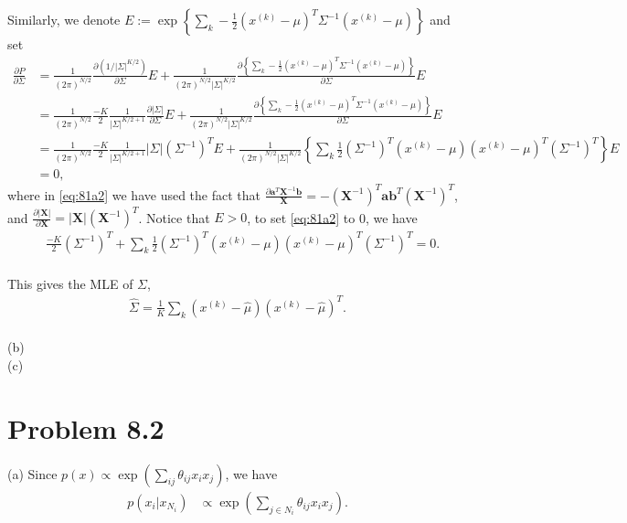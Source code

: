 \documentclass{article}
\newcommand{\bm}{\mathbf}
\begin{document}
Similarly, we denote $E := \exp\left\{\sum_k -\frac{1}{2}(x^{(k)}-\mu)^T\Sigma^{-1}(x^{(k)}-\mu)\right\}$ and set
\begin{align}
	\frac{\partial P}{\partial \Sigma} &= 
	\frac{1}{(2\pi)^{N/2}}\frac{\partial
	\left(1/|\Sigma|^{K/2}\right)}{\partial \Sigma}E +
	\frac{1}{(2\pi)^{N/2}|\Sigma|^{K/2}}
	\frac{\partial\left\{\sum_k -\frac{1}{2}(x^{(k)}-\mu)^T
	\Sigma^{-1}(x^{(k)}-\mu)\right\}}{\partial \Sigma}E\\
	&= \frac{1}{(2\pi)^{N/2}} \frac{-K}{2}\frac{1}
	{|\Sigma|^{K/2 + 1}}\frac{\partial |\Sigma|}{\partial \Sigma}E + 
	\frac{1}{(2\pi)^{N/2}|\Sigma|^{K/2}}
	\frac{\partial\left\{\sum_k -\frac{1}{2}(x^{(k)}-\mu)^T
	\Sigma^{-1}(x^{(k)}-\mu)\right\}}{\partial \Sigma}E\\
	&=\frac{1}{(2\pi)^{N/2}} \frac{-K}{2}\frac{1}
	{|\Sigma|^{K/2 + 1}}|\Sigma|(\Sigma^{-1})^T E +
	\frac{1}{(2\pi)^{N/2}|\Sigma|^{K/2}}
    \left\{\sum_k \frac{1}{2}(\Sigma^{-1})^T (x^{(k)}-\mu)
	(x^{(k)}-\mu)^T(\Sigma^{-1})^T\right\}E \label{eq:81a2}\\
	&=0,
\end{align}
%
where in \eqref{eq:81a2} we have used the fact that $\frac{\partial\bm{a}^T\bm{X}^{-1}\bm{b}}{\bm{X}}=-(\bm{X}^{-1})^T\bm{a}\bm{b}^T(\bm{X}^{-1})^T$, and $\frac{\partial|\bm{X}|}{\partial \bm{X}} = |\bm{X}|(\bm{X}^{-1})^T$. Notice that $E>0$,
to set \eqref{eq:81a2} to 0, we have
\begin{align}
	&\frac{-K}{2}(\Sigma^{-1})^T +
    \sum_k \frac{1}{2}(\Sigma^{-1})^T (x^{(k)}-\mu)
	(x^{(k)}-\mu)^T(\Sigma^{-1})^T = 0.\\
\end{align}

This gives the MLE of $\Sigma$,
\begin{align}
	\hat{\Sigma} = \frac{1}{K}\sum_k (x^{(k)}-\hat{\mu})
	(x^{(k)}-\hat{\mu})^T.
\end{align}
\\

\noindent
(b)
\\

\noindent
(c)

\pagebreak
\section*{Problem 8.2}
(a) Since $p(x) \propto \exp\left(\sum_{ij}\theta_{ij} x_i x_j\right)$,
we have
\begin{align*}
p(x_i | x_{N_i}) &\propto \exp\left(\sum_{j\in N_i}\theta_{ij} x_i x_j\right).
\end{align*}
%
\end{document}
